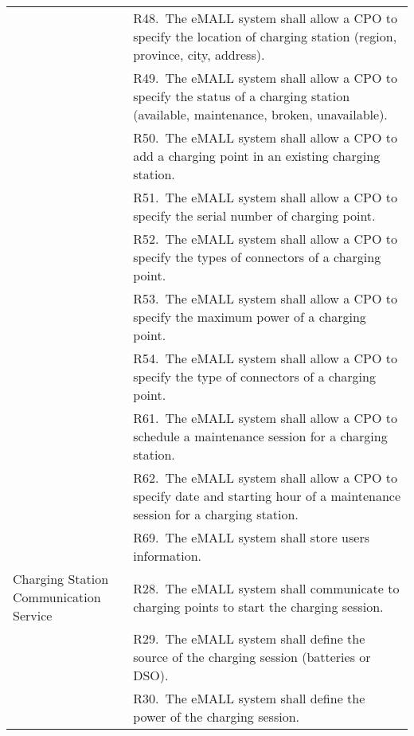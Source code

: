 \begin{center}
\begin{longtable}{p{0.3\linewidth}p{0.7\linewidth}}
        & R48.\ The eMALL system shall allow a CPO to specify the location of charging station (region, province, city, address).                         \\
        & R49.\ The eMALL system shall allow a CPO to specify the status of a charging station (available, maintenance, broken, unavailable).             \\
        & R50.\ The eMALL system shall allow a CPO to add a charging point in an existing charging station.                                               \\
        & R51.\ The eMALL system shall allow a CPO to specify the serial number of charging point.                                                        \\
        & R52.\ The eMALL system shall allow a CPO to specify the types of connectors of a charging point.                                                \\
        & R53.\ The eMALL system shall allow a CPO to specify the maximum power of a charging point.                                                      \\
        & R54.\ The eMALL system shall allow a CPO to specify the type of connectors of a charging point.                                                 \\
        & R61.\ The eMALL system shall allow a CPO to schedule a maintenance session for a charging station.                                              \\
        & R62.\ The eMALL system shall allow a CPO to specify date and starting hour of a maintenance session for a charging station.                     \\
        & R69.\ The eMALL system shall store users information.                                                                                           \\
        \hline
        Charging Station Communication Service & R28.\ The eMALL system shall communicate to charging points to start the charging session.                                                      \\
        & R29.\ The eMALL system shall define the source of the charging session (batteries or DSO).                                                      \\
        & R30.\ The eMALL system shall define the power of the charging session.                                                                          \\

\end{longtable}
\end{center}
